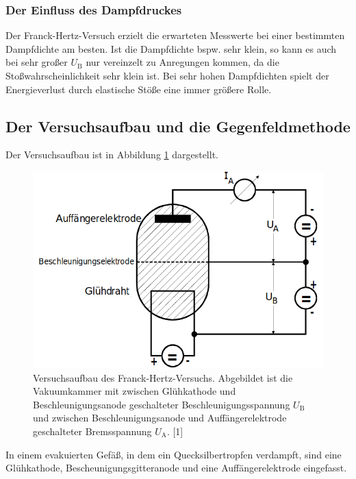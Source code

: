 \subsubsection{Der Einfluss des Dampfdruckes}

Der Franck-Hertz-Versuch erzielt die erwarteten Messwerte bei einer bestimmten Dampfdichte am besten.
Ist die Dampfdichte bspw. sehr klein, so kann es auch bei sehr großer $U_\text{B}$ nur vereinzelt
zu Anregungen kommen, da die Stoßwahrscheinlichkeit sehr klein ist. Bei sehr hohen Dampfdichten 
spielt der Energieverlust durch elastische Stöße eine immer größere Rolle.



\subsection{Der Versuchsaufbau und die Gegenfeldmethode}

Der Versuchsaufbau ist in Abbildung \ref{fig:bild1} dargestellt.

\begin{figure} [H]
    \centering
    \includegraphics[scale=0.4]{content/bild1.png}
    \caption{Versuchsaufbau des Franck-Hertz-Versuchs. Abgebildet ist die Vakuumkammer mit zwischen Glühkathode und
    Beschleunigungsanode geschalteter Beschleunigungsspannung $U_\text{B}$ und zwischen Beschleunigungsanode
    und Auffängerelektrode geschalteter Bremsspannung $U_\text{A}$. [1]}
    \label{fig:bild1}
  \end{figure}

In einem evakuierten Gefäß, in dem ein Quecksilbertropfen verdampft, sind
eine Glühkathode, Bescheunigungsgitteranode und eine Auffängerelektrode eingefasst.

